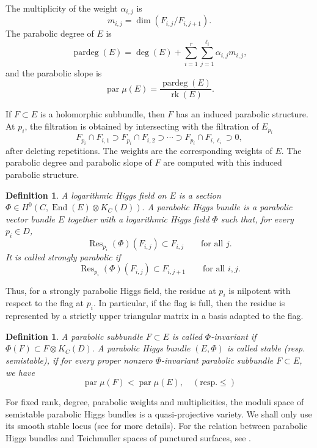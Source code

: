 \documentclass[10pt,a4paper]{amsart}
\numberwithin{equation}{section}
\newtheorem{definition}[theorem]{Definition}
\begin{document}
The multiplicity of the weight \(\alpha_{i,j}\) is
\[
        m_{i,j}
        =
        \dim(F_{i,j}/F_{i,j+1}).
\]
The parabolic degree of \(E\) is
\[
        \operatorname{pardeg}(E)
        =
        \deg(E)
        +
        \sum_{i=1}^{r}\sum_{j=1}^{\ell_i}
        \alpha_{i,j}m_{i,j},
\]
and the parabolic slope is
\[
        \operatorname{par}\mu(E)
        =
        \frac{\operatorname{pardeg}(E)}{\operatorname{rk}(E)}.
\]

If \(F\subset E\) is a holomorphic subbundle, then \(F\) has an induced
parabolic structure.  At \(p_i\), the filtration is obtained by intersecting
with the filtration of \(E_{p_i}\)
\[
        F_{p_i}\cap F_{i,1}\supset
        F_{p_i}\cap F_{i,2}\supset\cdots\supset
        F_{p_i}\cap F_{i,\ell_i}\supset0,
\]
after deleting repetitions. The weights are the corresponding weights of
\(E\). The parabolic degree and parabolic slope of \(F\) are computed with
this induced parabolic structure.

\begin{definition}
A logarithmic Higgs field on \(E\) is a section
\(
        \Phi\in H^0(C,\operatorname{End}(E)\otimes K_C(D)).
\)
A \textit{parabolic Higgs bundle} is a parabolic vector bundle \(E\) together with a
logarithmic Higgs field \(\Phi\) such that, for every \(p_i\in D\),
\[
        \operatorname{Res}_{p_i}(\Phi)(F_{i,j})
        \subset F_{i,j}
        \qquad
        \text{for all }j.
\]
It is called \textit{strongly parabolic} if
\[
        \operatorname{Res}_{p_i}(\Phi)(F_{i,j})
        \subset F_{i,j+1}
        \qquad
        \text{for all }i,j.
\]
\end{definition}

Thus, for a strongly parabolic Higgs field, the residue at \(p_i\) is nilpotent
with respect to the flag at \(p_i\). In particular, if the flag is full, then
the residue is represented by a strictly upper triangular matrix in a basis
adapted to the flag.

\begin{definition}
A parabolic subbundle \(F\subset E\) is called \(\Phi\)-invariant if
\(
        \Phi(F)\subset F\otimes K_C(D).
\)
A parabolic Higgs bundle \((E,\Phi)\) is called \textit{stable} (resp. \textit{semistable}), if for
every proper nonzero \(\Phi\)-invariant parabolic subbundle \(F\subset E\), we have
\[
        \operatorname{par}\mu(F)<\operatorname{par}\mu(E),
        \quad (\text{resp.} \leq)        
\]
\end{definition}

For fixed rank, degree, parabolic weights and multiplicities, the moduli space
of semistable parabolic Higgs bundles is a quasi-projective variety.  We shall
only use its smooth stable locus (see \cite{MehtaSeshadri, Yokogawa, BodenYokogawa, BiswasParabolic} for more details). For the relation between parabolic Higgs bundles and Teichmuller
spaces of punctured surfaces, see \cite{BiswasGastesiGovindarajan}.
\end{document}
